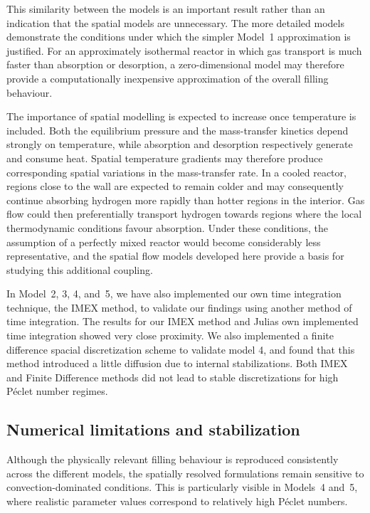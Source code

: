 This similarity between the models is an important result rather than an indication that the spatial models are unnecessary. The more detailed models demonstrate the conditions under which the simpler Model~1 approximation is justified. For an approximately isothermal reactor in which gas transport is much faster than absorption or desorption, a zero-dimensional model may therefore provide a computationally inexpensive approximation of the overall filling behaviour.

The importance of spatial modelling is expected to increase once temperature is included. Both the equilibrium pressure and the mass-transfer kinetics depend strongly on temperature, while absorption and desorption respectively generate and consume heat. Spatial temperature gradients may therefore produce corresponding spatial variations in the mass-transfer rate. In a cooled reactor, regions close to the wall are expected to remain colder and may consequently continue absorbing hydrogen more rapidly than hotter regions in the interior. Gas flow could then preferentially transport hydrogen towards regions where the local thermodynamic conditions favour absorption. Under these conditions, the assumption of a perfectly mixed reactor would become considerably less representative, and the spatial flow models developed here provide a basis for studying this additional coupling.

In Model~2, 3, 4, and~5, we have also implemented our own time integration technique, the IMEX method, to validate our findings using another method of time integration. The results for our IMEX method and Julias own implemented time integration showed very close proximity. We also implemented a finite difference spacial discretization scheme to validate model 4, and found that this method introduced a little diffusion due to internal stabilizations. Both IMEX and Finite Difference methods did not lead to stable discretizations for high P\'eclet number regimes.

\subsection{Numerical limitations and stabilization}

Although the physically relevant filling behaviour is reproduced consistently across the different models, the spatially resolved formulations remain sensitive to convection-dominated conditions. This is particularly visible in Models~4 and~5, where realistic parameter values correspond to relatively high P\'eclet numbers.

